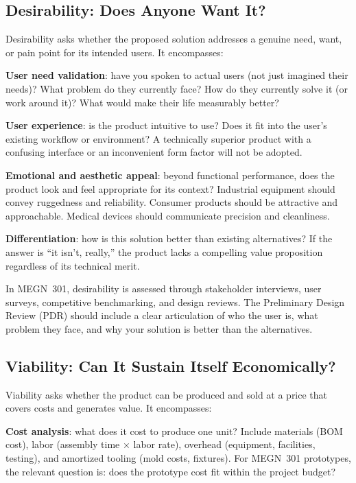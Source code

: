 \documentclass[11pt,letterpaper,twoside,openany]{book}
\begin{document}
\subsection{Desirability: Does Anyone Want It?}
Desirability asks whether the proposed solution addresses a genuine need, want, or pain point for its intended users. It encompasses:

\textbf{User need validation}: have you spoken to actual users (not just imagined their needs)? What problem do they currently face? How do they currently solve it (or work around it)? What would make their life measurably better?

\textbf{User experience}: is the product intuitive to use? Does it fit into the user's existing workflow or environment? A technically superior product with a confusing interface or an inconvenient form factor will not be adopted.

\textbf{Emotional and aesthetic appeal}: beyond functional performance, does the product look and feel appropriate for its context? Industrial equipment should convey ruggedness and reliability. Consumer products should be attractive and approachable. Medical devices should communicate precision and cleanliness.

\textbf{Differentiation}: how is this solution better than existing alternatives? If the answer is ``it isn't, really,'' the product lacks a compelling value proposition regardless of its technical merit.

In MEGN~301, desirability is assessed through stakeholder interviews, user surveys, competitive benchmarking, and design reviews. The Preliminary Design Review (PDR) should include a clear articulation of who the user is, what problem they face, and why your solution is better than the alternatives.

\subsection{Viability: Can It Sustain Itself Economically?}
Viability asks whether the product can be produced and sold at a price that covers costs and generates value. It encompasses:

\textbf{Cost analysis}: what does it cost to produce one unit? Include materials (BOM cost), labor (assembly time $\times$ labor rate), overhead (equipment, facilities, testing), and amortized tooling (mold costs, fixtures). For MEGN~301 prototypes, the relevant question is: does the prototype cost fit within the project budget?
\end{document}
